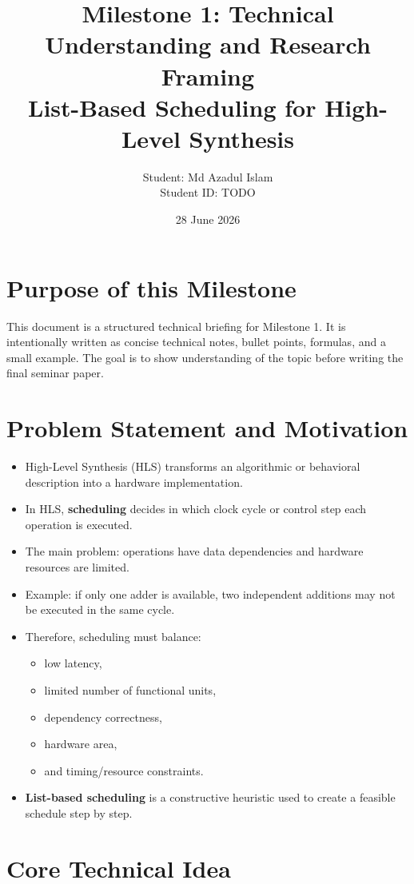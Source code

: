 \documentclass[11pt,a4paper]{article}
\title{Milestone 1: Technical Understanding and Research Framing\\
\large List-Based Scheduling for High-Level Synthesis}
\author{Student: Md Azadul Islam\\Student ID: TODO}
\date{28 June 2026}
\begin{document}
\maketitle

\section*{Purpose of this Milestone}
This document is a structured technical briefing for Milestone 1.
It is intentionally written as concise technical notes, bullet points, formulas, and a small example.
The goal is to show understanding of the topic before writing the final seminar paper.

\section{Problem Statement and Motivation}

\begin{itemize}[leftmargin=*]
    \item High-Level Synthesis (HLS) transforms an algorithmic or behavioral description into a hardware implementation.
    \item In HLS, \textbf{scheduling} decides in which clock cycle or control step each operation is executed.
    \item The main problem: operations have data dependencies and hardware resources are limited.
    \item Example: if only one adder is available, two independent additions may not be executed in the same cycle.
    \item Therefore, scheduling must balance:
    \begin{itemize}
        \item low latency,
        \item limited number of functional units,
        \item dependency correctness,
        \item hardware area,
        \item and timing/resource constraints.
    \end{itemize}
    \item \textbf{List-based scheduling} is a constructive heuristic used to create a feasible schedule step by step.
\end{itemize}

\section{Core Technical Idea}
\end{document}
